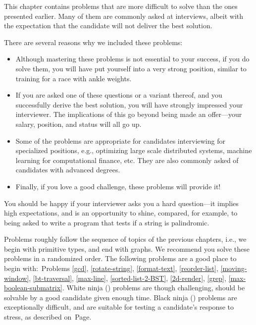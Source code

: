 \documentclass[10pt,openany,twoside,letterpaper,extrafontsizes]{memoir}
\begin{document}
\begin{Spacing}{\honorsSpacing}

\noindent
This chapter contains problems that are more difficult to solve than the ones presented earlier.
Many of them are commonly asked at interviews, albeit with the
expectation that the candidate will not deliver the best solution.

There are several reasons why we included these problems:
\begin{itemize}
\item Although mastering these problems is not essential
to your success, if you do solve them, you will have put yourself into a very strong
position, similar to training for a race with ankle weights.
\item If you are asked one of these questions or a variant thereof, and you successfully derive the best
solution, you will have strongly impressed your interviewer.
The implications of this go beyond being made
an offer---your salary, position, and status will all go up.
\item Some of the problems
are appropriate for candidates interviewing for specialized positions, e.g., optimizing large scale distributed systems,
machine learning for computational finance, etc. They are also commonly asked of
candidates with advanced degrees.
\item Finally, if you love a good challenge, these problems will provide it!
\end{itemize}
You should be happy if your interviewer asks you a hard question---it implies high expectations, and
is an opportunity to shine, compared, for example,
to being asked to write a program that tests if a string is palindromic.

Problems roughly follow the sequence of topics of the previous chapters, i.e., we begin with primitive
types, and end with graphs.
We recommend you solve these problems in a randomized order.
The following problems are a good place to begin with:~Problems \ref{gcd}, \ref{rotate-string}, \ref{format-text}, \ref{reorder-list}, \ref{moving-window}, \ref{bt-traversal}, \ref{max-line}, \ref{sorted-list-2-BST}, \ref{2d-render}, \ref{grep}, \ref{max-boolean-submatrix}.
White ninja () problems are though challenging, should be solvable
by a good candidate given enough time.
Black ninja () problems are exceptionally difficult, and
are suitable for testing a candidate's response to stress, as described on~Page\pageref{stress-interview}.


\end{Spacing}
\end{document}
